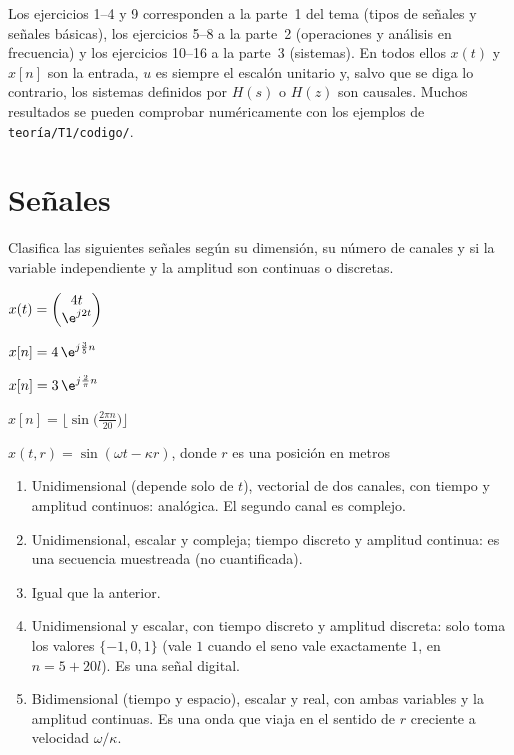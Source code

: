 \documentclass[11pt,a4paper]{scrartcl}
\begin{document}
\ifsoluciones{}\else{}\fi

Los ejercicios 1–4 y 9 corresponden a la parte~1 del tema (tipos de señales y señales básicas), los ejercicios 5–8 a la parte~2 (operaciones y análisis en frecuencia) y los ejercicios 10–16 a la parte~3 (sistemas). En todos ellos $x(t)$ y $x[n]$ son la entrada, $u$ es siempre el escalón unitario y, salvo que se diga lo contrario, los sistemas definidos por $H(s)$ o $H(z)$ son causales. Muchos resultados se pueden comprobar numéricamente con los ejemplos de \texttt{teoría/T1/codigo/}.

\section*{Señales}

\begin{ejercicio}[clasificación]
  Clasifica las siguientes señales según su dimensión, su número de canales y si la variable independiente y la amplitud son continuas o discretas.
  \begin{incisos}[2]
    \item $x(t)=\begin{pmatrix}4t\\ \e^{j2t}\end{pmatrix}$
    \item $x[n]=4\,\e^{j\frac35n}$
    \item $x[n]=3\,\e^{j\frac2\pi n}$
    \item $x[n]=\big\lfloor\sin\big(\tfrac{2\pi n}{20}\big)\big\rfloor$
    \item $x(t,r)=\sin(\omega t-\kappa r)$, donde $r$ es una posición en metros
  \end{incisos}
\end{ejercicio}
\begin{solucion}
  \begin{enumerate}[label=\alph*)]
    \item Unidimensional (depende solo de $t$), vectorial de dos canales, con tiempo y amplitud continuos: analógica. El segundo canal es complejo.
    \item Unidimensional, escalar y compleja; tiempo discreto y amplitud continua: es una secuencia muestreada (no cuantificada).
    \item Igual que la anterior.
    \item Unidimensional y escalar, con tiempo discreto y amplitud discreta: solo toma los valores $\{-1,0,1\}$ (vale $1$ cuando el seno vale exactamente $1$, en $n=5+20l$). Es una señal digital.
    \item Bidimensional (tiempo y espacio), escalar y real, con ambas variables y la amplitud continuas. Es una onda que viaja en el sentido de $r$ creciente a velocidad $\omega/\kappa$.
  \end{enumerate}
\end{solucion}
\end{document}
